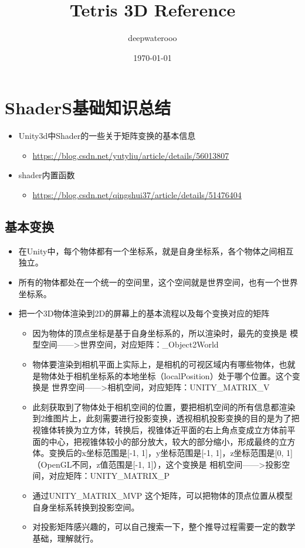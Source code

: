 \documentclass[9pt, b5paper]{article}
\author{deepwaterooo}
\date{\today}
\title{Tetris 3D Reference}
\begin{document}
\maketitle
\tableofcontents


\section{ShaderS基础知识总结}
\label{sec-1}
\begin{itemize}
\item Unity3d中Shader的一些关于矩阵变换的基本信息
\begin{itemize}
\item \url{https://blog.csdn.net/yutyliu/article/details/56013807}
\end{itemize}
\item shader内置函数
\begin{itemize}
\item \url{https://blog.csdn.net/qingshui37/article/details/51476404}
\end{itemize}
\end{itemize}
\subsection{基本变换}
\label{sec-1-1}
\begin{itemize}
\item 在Unity中，每个物体都有一个坐标系，就是自身坐标系，各个物体之间相互独立。
\item 所有的物体都处在一个统一的空间里，这个空间就是世界空间，也有一个世界坐标系。
\item 把一个3D物体渲染到2D的屏幕上的基本流程以及每个变换对应的矩阵

\begin{itemize}
\item 因为物体的顶点坐标是基于自身坐标系的，所以渲染时，最先的变换是 模型空间——>世界空间，对应矩阵：\_Object2World
\item 物体要渲染到相机平面上实际上，是相机的可视区域内有哪些物体，也就是物体处于相机坐标系的本地坐标（localPosition）处于哪个位置。这个变换是 世界空间——>相机空间，对应矩阵：UNITY\_MATRIX\_V
\item 此刻获取到了物体处于相机空间的位置，要把相机空间的所有信息都渲染到2维图片上，此刻需要进行投影变换，透视相机投影变换的目的是为了把视锥体转换为立方体，转换后，视锥体近平面的右上角点变成立方体前平面的中心，把视锥体较小的部分放大，较大的部分缩小，形成最终的立方体。变换后的x坐标范围是[-1, 1]，y坐标范围是[-1, 1]，z坐标范围是[0, 1]（OpenGL不同，z值范围是[-1, 1]），这个变换是 相机空间——>投影空间，对应矩阵：UNITY\_MATRIX\_P
\item 通过UNITY\_MATRIX\_MVP 这个矩阵，可以把物体的顶点位置从模型自身坐标系转换到投影空间。
\item 对投影矩阵感兴趣的，可以自己搜索一下，整个推导过程需要一定的数学基础，理解就行。
\end{itemize}
\end{itemize}
\end{document}
